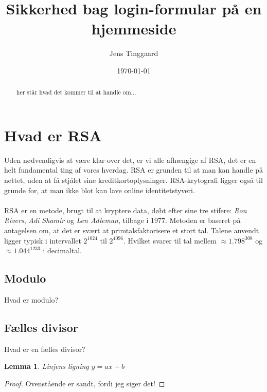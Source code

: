 \documentclass[a4paper, 12pt]{article}
\date{\today}
\title{Sikkerhed bag login-formular på en hjemmeside}
\author{Jens Tinggaard}
\theoremstyle{break}
\newtheorem{lemma}{Lemma} %
\newenvironment{boxframed}
  {\begin{mdframed}\begin{lemma}}
  {\end{lemma}\end{mdframed}}
\begin{document}
\clearpage\maketitle
\thispagestyle{empty}
\maketitle

\begin{abstract}
her står hvad det kommer til at handle om...
\end{abstract}



\newpage
\tableofcontents


\newpage
\section{Hvad er RSA}
Uden nødvendigvis at være klar over det, er vi alle afhængige af RSA, det er en helt fundamental ting af vores hverdag.
RSA er grunden til at man kan handle på nettet, uden at få stjålet sine kreditkortoplysninger.
RSA-krytografi ligger også til grunde for, at man ikke blot kan lave online identitetstyveri.\autocite{vestergaard}
\\
\\
RSA er en metode, brugt til at kryptere data, døbt efter sine tre stifere:
\textit{Ron Rivers}, \textit{Adi Shamir} og \textit{Len Adleman}, tilbage i 1977.\autocite{vestergaard}
Metoden er baseret på antagelsen om, at det er svært at primtalsfaktorisere et stort tal.
Talene anvendt ligger typisk i intervallet \(2^{1024}\) til \(2^{4096}\).
Hvilket svarer til tal mellem \(\approx1.798^{308}\) og \(\approx1.044^{1233}\) i decimaltal.\autocite{MANGLER}

    \subsection{Modulo}
    Hvad er modulo?

    \subsection{Fælles divisor}
    Hvad er en fælles divisor?


    \begin{boxframed}
        Linjens ligning \(y=ax+b\)
    \end{boxframed}

    \begin{proof}
        Ovenstående er sandt, fordi jeg siger det!
    \end{proof}
\end{document}
